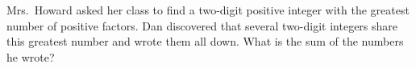 Mrs.\ Howard asked her class to find a two-digit positive integer with the greatest number of positive factors. Dan discovered that several two-digit integers share this greatest number and wrote them all down. What is the sum of the numbers he wrote?
